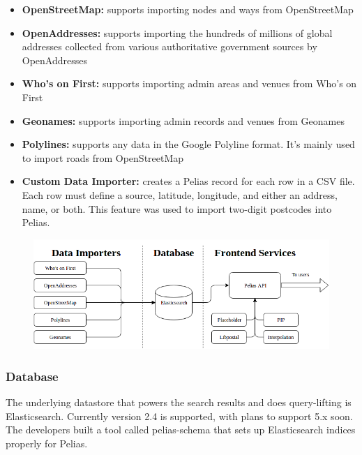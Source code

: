 \begin{itemize}
\item \textbf{OpenStreetMap:} supports importing nodes and ways from OpenStreetMap
\item \textbf{OpenAddresses:} supports importing the hundreds of millions of global addresses collected from various authoritative government sources by OpenAddresses
\item \textbf{Who's on First:} supports importing admin areas and venues from Who's on First
\item \textbf{Geonames:} supports importing admin records and venues from Geonames
\item \textbf{Polylines:} supports any data in the Google Polyline format. It's mainly used to import roads from OpenStreetMap
\item \textbf{Custom Data Importer:} creates a Pelias record for each row in a CSV file. Each row must define a source, latitude, longitude, and either an address, name, or both. This feature was used to import two-digit postcodes into Pelias.
\end{itemize}

\begin{figure}[H]
\centering
\includegraphics[width=1.0\textwidth]{img/pelias_architecture}
\label{fig:pelias_architecture}
\end{figure}

\subsubsection{Database}
The underlying datastore that powers the search results and does query-lifting is Elasticsearch. Currently version 2.4 is supported, with plans to support 5.x soon. The developers built a tool called pelias-schema that sets up Elasticsearch indices properly for Pelias.

